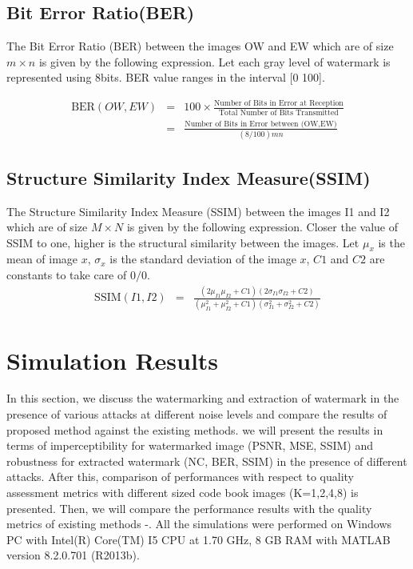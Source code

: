 \subsection{Bit Error Ratio(BER)} 

The Bit Error Ratio (BER) between the images OW and EW which are of size $m \times n$ is given by the following expression. Let each gray level of watermark is represented using 8bits. BER value ranges in the interval [0 100].

\begin{eqnarray}
\nonumber
\text{BER}(OW,EW)&=&100 \times \frac{\text{Number of Bits in Error at Reception}}{\text{Total Number of Bits Transmitted}} \\
&=& \frac{\text{Number of Bits in Error between (OW,EW)}}{(8/100)mn}
\nonumber
\end{eqnarray}

\subsection{Structure Similarity Index Measure(SSIM)}
The Structure Similarity Index Measure (SSIM) between the images I1 and I2 which are of size  $M \times N$ is given by the following expression. Closer the value of SSIM to one, higher is the structural similarity between the images. Let $\mu_x$ is the mean of image $x$, $\sigma_x$ is the standard deviation of the image $x$, $C1$ and $C2$ are constants to take care of $0/0$.\\

\begin{eqnarray}
\nonumber
\text{SSIM}(I1,I2)&=& \frac{(2\mu_{I1}\mu_{I2}+C1)(2\sigma_{I1}\sigma_{I2}+C2)}{(\mu_{I1}^2+\mu_{I2}^2+C1)(\sigma_{I1}^2+\sigma_{I2}^2+C2)}
\nonumber
\end{eqnarray}
\newline
\section{Simulation Results}
\label{SRWMM}
In this section, we discuss the watermarking and extraction of watermark in the presence of various attacks at different noise levels and compare the results of proposed method against the existing methods. we will present the results in terms of imperceptibility for watermarked image (PSNR, MSE, SSIM) and robustness for extracted watermark (NC, BER, SSIM) in the presence of different attacks. After this, comparison of performances with respect to quality assessment metrics with different sized code book images (K=1,2,4,8) is presented. Then, we will compare the performance results with the quality metrics of existing methods \cite{P4}-\cite{P20}. All the simulations were performed on Windows PC with Intel(R) Core(TM) I5 CPU at 1.70 GHz, 8 GB RAM with MATLAB version 8.2.0.701 (R2013b).  \\

